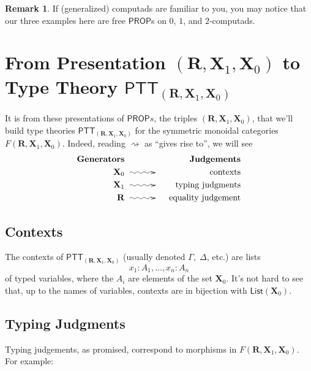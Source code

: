 \documentclass[pra,floatfix,
amsmath,superscriptaddress, 12pt]{article}
\theoremstyle{definition}
\newtheorem*{remark}{Remark}
\begin{document}
\begin{remark} If (generalized) computads are familiar to you, you may notice that our three examples here are free $\mathsf{PROP}$s on $0$, $1$, and $2$-computads.
\end{remark}

\section{From Presentation $(\mathbf{R},\mathbf{X}_1,\mathbf{X}_0)$ to Type Theory $\mathsf{PTT}_{(\mathbf{R},\mathbf{X}_1,\mathbf{X}_0)}$}

It is from these presentations of $\mathsf{PROP}s$, the triples $(\mathbf{R},\mathbf{X}_1,\mathbf{X}_0)$, that we'll build type theories $\mathsf{PTT}_{(\mathbf{R},\mathbf{X}_1,\mathbf{X}_0)}$ for the symmetric monoidal categories $F(\mathbf{R},\mathbf{X}_1,\mathbf{X}_0)$. Indeed, reading $\rightsquigarrow$ as ``gives rise to'', we will see
    \begin{eqnarray*}
      \mathbf{Generators}
        &
            &
            \mathbf{Judgements}
                \\
      \mathbf{X}_0
        & \xymatrix@C=3em{{}\ar@{~>}[r]&{}}
            & \mathrm{contexts} \\
      \mathbf{X}_1 & \xymatrix@C=3em{{}\ar@{~>}[r]&{}} & \mathrm{typing \ judgments} \\
      \mathbf{R}   & \xymatrix@C=3em{{}\ar@{~>}[r]&{}} & \mathrm{equality \ judgement}
    \end{eqnarray*}

\subsection{Contexts}

The contexts of $\mathsf{PTT}_{(\mathbf{R},\mathbf{X}_1,\mathbf{X}_0)}$ (usually denoted $\Gamma,\;\Delta$, etc.) are lists
    \[
        x_{1}:A_{1},\dots,x_{n}:A_{n}
    \]
of typed variables, where the $A_i$ are elements of the set $\mathbf{X}_{0}$. It's not hard to see that, up to the names of variables, contexts are in bijection with $\mathsf{List}(\mathbf{X}_0)$.

\subsection{Typing Judgments}

Typing judgements, as promised, correspond to morphisms in $F(\mathbf{R},\mathbf{X}_1,\mathbf{X}_0)$. For example:
\end{document}
